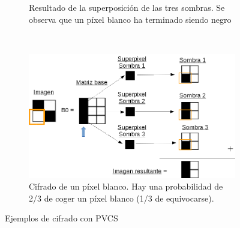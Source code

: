 \begin{figure}[ht]
\begin{subfigure}[t]{0.3\textwidth}
		\caption{Resultado de la superposición de las tres sombras. Se
			observa que un píxel blanco ha terminado siendo negro}
		\label{fig:cifradoPVCSres}
	\end{subfigure}
	\\[0.5cm]
	\begin{subfigure}[t]{0.6\textwidth}
		\centering
		\includegraphics[width=\textwidth]{images/PVCSblanco}
		\caption{Cifrado de un píxel blanco. Hay una probabilidad de 2/3
		de coger un píxel blanco (1/3 de equivocarse).}
		\label{fig:cifradoPVCSb}
	\end{subfigure}
	\caption{Ejemplos de cifrado con PVCS}
	\label{fig:ejemplosPVCS}
\end{figure}
